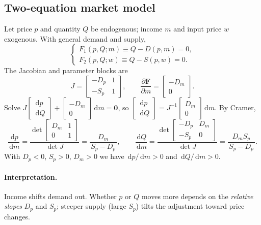 \documentclass[11pt]{article}
\newcommand{\dd}{\,\mathrm{d}}
\newcommand{\pd}[2]{\frac{\partial #1}{\partial #2}}
\newcommand{\vect}[1]{\bm{#1}}
\begin{document}
\subsection*{Two-equation market model}
Let price $p$ and quantity $Q$ be endogenous; income $m$ and input price $w$ exogenous. With general demand and supply,
\[
\begin{cases}
F_1(p,Q;m)\equiv Q - D(p,m)=0,\\
F_2(p,Q;w)\equiv Q - S(p,w)=0.
\end{cases}
\]
The Jacobian and parameter blocks are
\[
J=
\begin{bmatrix}
- D_p & 1\\
- S_p & 1
\end{bmatrix},
\qquad
\pd{\vect{F}}{m}=
\begin{bmatrix}
- D_m\\
0
\end{bmatrix}.
\]
Solve $J\begin{bmatrix}\dd p\\ \dd Q\end{bmatrix} + \begin{bmatrix}-D_m\\0\end{bmatrix}\dd m=\vect{0}$,
so $\begin{bmatrix}\dd p\\ \dd Q\end{bmatrix} = J^{-1}\!\begin{bmatrix}D_m\\0\end{bmatrix}\dd m$.
By Cramer,
\[
\frac{\dd p}{\dd m}=\frac{\det \begin{bmatrix} D_m & 1\\ 0 & 1\end{bmatrix}}{\det J}
=\frac{D_m}{\,S_p - D_p\,},
\qquad
\frac{\dd Q}{\dd m}=\frac{\det \begin{bmatrix} -D_p & D_m\\ -S_p & 0\end{bmatrix}}{\det J}
=\frac{D_m S_p}{\,S_p - D_p\,}.
\]
With $D_p<0$, $S_p>0$, $D_m>0$ we have $\dd p/\dd m>0$ and $\dd Q/\dd m>0$.

\paragraph{Interpretation.}
Income shifts demand out. Whether $p$ or $Q$ moves more depends on the \emph{relative slopes} $D_p$ and $S_p$; steeper supply (large $S_p$) tilts the adjustment toward price changes.
\end{document}
